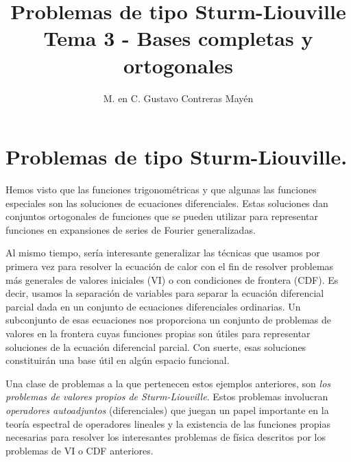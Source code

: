 
\title{Problemas de tipo Sturm-Liouville \\ \large {Tema 3 - Bases completas y ortogonales}\vspace{-3ex}}

\author{M. en C. Gustavo Contreras Mayén}
\date{ }

\pagestyle{fancy}
\fancyhf{}
\lhead{\leftmark}
\rfoot{\thepage}
\setlength{\headheight}{16pt}%



\maketitle
\fontsize{14}{14}\selectfont
\tableofcontents
\newpage

\section{Problemas de tipo Sturm-Liouville.}

Hemos visto que las funciones trigonométricas y que algunas las funciones especiales son las soluciones de ecuaciones diferenciales. Estas soluciones dan conjuntos ortogonales de funciones que se pueden utilizar para representar funciones en expansiones de series de Fourier generalizadas.
\par
Al mismo tiempo, sería interesante generalizar las técnicas que usamos por primera vez para resolver la ecuación de calor con el fin de resolver problemas más generales de valores iniciales (VI) o con condiciones de frontera (CDF). Es decir, usamos la separación de variables para separar la ecuación diferencial parcial dada en un conjunto de ecuaciones diferenciales ordinarias. Un subconjunto de esas ecuaciones nos proporciona un conjunto de problemas de valores en la frontera cuyas funciones propias son útiles para representar soluciones de la ecuación diferencial parcial. Con suerte, esas soluciones constituirán una base útil en algún espacio funcional.
\par
Una clase de problemas a la que pertenecen estos ejemplos anteriores, son \emph{los problemas de valores propios de Sturm-Liouville}. Estos problemas involucran \emph{operadores autoadjuntos} (diferenciales) que juegan un papel importante en la teoría espectral de operadores lineales y la existencia de las funciones propias necesarias para resolver los interesantes problemas de física descritos por los problemas de VI o CDF anteriores.

